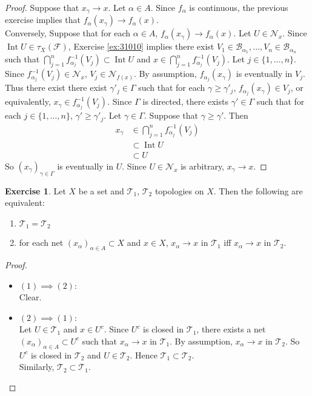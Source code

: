 \documentclass[12pt]{amsart}
\theoremstyle{definition}
\newtheorem{ex}[definition]{Exercise}
\newcommand{\al}{\alpha}
\newcommand{\gam}{\gamma}
\newcommand{\Gam}{\Gamma}
\newcommand{\MB}{\mathcal{B}}
\newcommand{\MF}{\mathcal{F}}
\newcommand{\MN}{\mathcal{N}}
\newcommand{\MT}{\mathcal{T}}
\DeclareMathOperator{\Int}{Int}
\DeclareMathOperator*{\0}{\mbf{0}}
\DeclareMathOperator*{\1}{\mbf{1}}
\newcommand{\lex}[1]{\label{ex:#1}}
\newcommand{\rex}[1]{Exercise \ref{ex:#1}}
\begin{document}
	\begin{proof}
	Suppose that $x_{\gam} \rightarrow x$. Let $\al \in A$. Since $f_{\al}$ is continuous, the previous exercise implies that $f_{\al}(x_{\gam}) \rightarrow f_{\al}(x)$. \\
	Conversely, Suppose that for each $\al \in A$,  $f_{\al}(x_{\gam}) \rightarrow f_{\al}(x)$. Let $U \in \MN_x$. Since $\Int U \in \tau_X(\MF)$, \rex{31010} implies there exist $V_1 \in \MB_{\al_1}, \ldots, V_n \in \MB_{\al_n}$ such that $\bigcap\limits_{j=1}^n f_{\al_j}^{-1}(V_j) \subset \Int U$ and $x \in \bigcap\limits_{j=1}^n f_{\al_j}^{-1}(V_j)$. Let $j \in \{1, \ldots, n\}$. Since $f_{\al_j}^{-1}(V_j) \in \MN_x$, $V_j \in \MN_{f(x)}$. By assumption, $f_{\al_j}(x_{\gam})$ is eventually in $V_j$. Thus there exist there exist $\gam'_j \in \Gam$ such that for each $\gam \geq \gam'_j$, $f_{\al_j}(x_{\gam}) \in V_j$, or equivalently, $x_{\gam} \in f_{\al_j}^{-1}(V_j)$. Since $\Gam$ is directed, there exists $\gam' \in \Gam$ such that for each $j \in \{1, \ldots, n\}$, $\gam' \geq \gam'_j$. Let $\gam \in \Gam$. Suppose that $\gam \geq \gam'$. Then 
	\begin{align*}
	x_{\gam} 
	& \in \bigcap\limits_{j=1}^n f_{\al_j}^{-1}(V_j) \\
	& \subset \Int U \\
	& \subset U
\end{align*}	
	So $(x_\gam)_{\gam \in \Gam}$ is eventually in $U$. Since $U \in \MN_x$ is arbitrary, $x_{\gam} \rightarrow x$.  
	\end{proof}
	
	
	\begin{ex} \lex{33012}
	Let $X$ be a set and $\MT_1$, $\MT_2$ topologies on $X$. Then the following are equivalent:
	\begin{enumerate}
		\item $\MT_1 = \MT_2$
		\item for each net $(x_{\al})_{\al \in A} \subset X$ and $x \in X$, $x_{\al} \rightarrow x$ in $\MT_1$ iff $x_{\al} \rightarrow x$ in $\MT_2$.
	\end{enumerate}
	\end{ex}

	\begin{proof}\
		\begin{itemize}
			\item $(1) \implies (2)$: \\
			Clear. \\
			\item $(2) \implies (1)$: \\
			Let $U \in \MT_1$ and $x \in U^c$. Since $U^c$ is closed in $\MT_1$, there exists a net $(x_{\al})_{\al \in A} \subset U^c$ such that $x_{\al} \rightarrow x$ in $\MT_1$. By assumption, $x_{\al} \rightarrow x$ in $\MT_2$. So $U^c$ is closed in $\MT_2$ and $U \in \MT_2$. Hence $\MT_1 \subset \MT_2$. \\
			Similarly, $\MT_2 \subset \MT_1$.
		\end{itemize}
	\end{proof}
	
\end{document}
